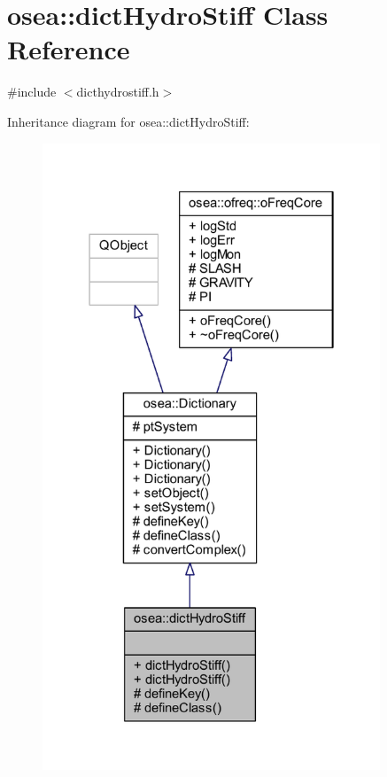 \hypertarget{classosea_1_1dict_hydro_stiff}{\section{osea\-:\-:dict\-Hydro\-Stiff Class Reference}
\label{classosea_1_1dict_hydro_stiff}
}


{\ttfamily \#include $<$dicthydrostiff.\-h$>$}



Inheritance diagram for osea\-:\-:dict\-Hydro\-Stiff\-:
\nopagebreak
\begin{figure}[H]
\begin{center}
\leavevmode
\includegraphics[width=286pt]{classosea_1_1dict_hydro_stiff__inherit__graph}
\end{center}
\end{figure}
